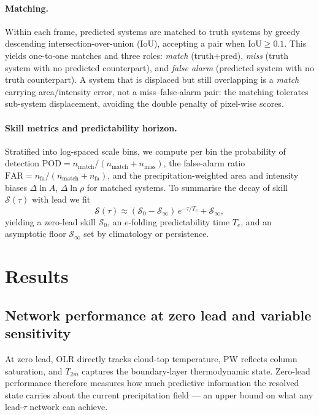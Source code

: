 \documentclass[11pt]{article}
\begin{document}
\paragraph{Matching.}
Within each frame, predicted systems are matched to truth systems by greedy
descending intersection-over-union (IoU), accepting a pair when
$\mathrm{IoU}\ge0.1$.
This yields one-to-one matches and three roles: \emph{match} (truth+pred),
\emph{miss} (truth system with no predicted counterpart), and \emph{false alarm}
(predicted system with no truth counterpart).
A system that is displaced but still overlapping is a \emph{match} carrying
area/intensity error, not a miss--false-alarm pair: the matching tolerates
sub-system displacement, avoiding the double penalty of pixel-wise scores.

\paragraph{Skill metrics and predictability horizon.}
Stratified into log-spaced scale bins, we compute per bin the probability of
detection $\mathrm{POD}=n_{\text{match}}/(n_{\text{match}}+n_{\text{miss}})$,
the false-alarm ratio $\mathrm{FAR}=n_{\text{fa}}/(n_{\text{match}}+n_{\text{fa}})$,
and the precipitation-weighted area and intensity biases $\Delta\ln A$,
$\Delta\ln\rho$ for matched systems.
To summarise the decay of skill $\mathcal{S}(\tau)$ with lead we fit
\begin{equation}\label{eq:efold}
\mathcal{S}(\tau)\approx(\mathcal{S}_0-\mathcal{S}_\infty)\,e^{-\tau/T_e}+\mathcal{S}_\infty,
\end{equation}
yielding a zero-lead skill $\mathcal{S}_0$, an $e$-folding predictability
time $T_e$, and an asymptotic floor $\mathcal{S}_\infty$ set by
climatology or persistence.

\section{Results}
\label{sec:results}

\subsection{Network performance at zero lead and variable sensitivity}
\label{sec:lead0}

At zero lead, OLR directly tracks cloud-top temperature, PW reflects column
saturation, and $T_{2m}$ captures the boundary-layer thermodynamic state.
Zero-lead performance therefore measures how much predictive information the
resolved state carries about the current precipitation field --- an upper bound
on what any lead-$\tau$ network can achieve.
\end{document}

